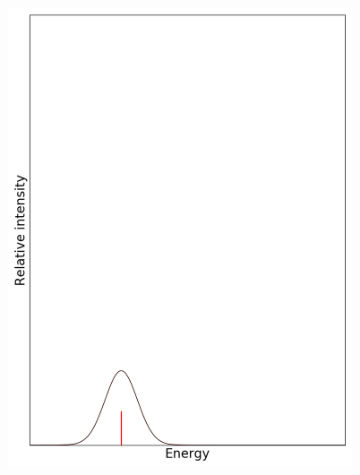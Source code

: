 \documentclass[12pt, fleqn]{beamer}
\begin{document}
\begin{frame}
\begin{overlayarea}{\textwidth}{14cm}
{\begin{figure}[h!]
\begin{subfigure}[b]{0.45\linewidth}
                    \includegraphics[width=\linewidth]{fc_sp/sp_0.png}
                \end{subfigure}
            \end{figure}
        }
\end{overlayarea}
\end{frame}
\end{document}
